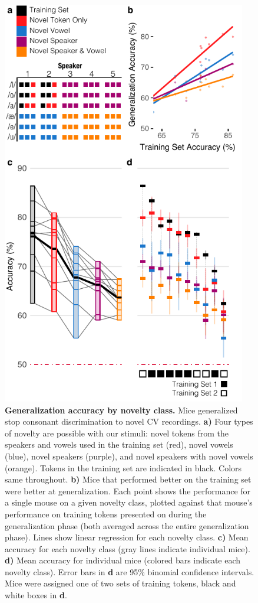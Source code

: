 \begin{figure}[!ht]
\includegraphics[width=4.2in]{speech/figures/Figure2.pdf}
\caption{\textbf{Generalization accuracy by novelty class.} Mice generalized stop consonant discrimination to novel CV recordings. \textbf{a)} Four types of novelty are possible with our stimuli: novel tokens from the speakers and vowels used in the training set (red), novel vowels (blue), novel speakers (purple), and novel speakers with novel vowels (orange). Tokens in the training set are indicated in black. Colors same throughout. \textbf{b)} Mice that performed better on the training set were better at generalization. Each point shows the performance for a single mouse on a given novelty class, plotted against that mouse's performance on training tokens presented on during the generalization phase (both averaged across the entire generalization phase). Lines show linear regression for each novelty class. \textbf{c)} Mean accuracy for each novelty class (gray lines indicate individual mice). \textbf{d)} Mean accuracy for individual mice (colored bars indicate each novelty class). Error bars in \textbf{d} are 95\% binomial confidence intervals. Mice were assigned one of two sets of training tokens, black and white boxes in \textbf{d}.}
\label{gen}
\end{figure}

